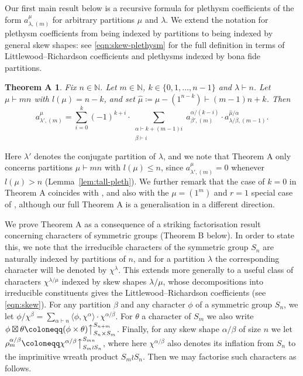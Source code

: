 \documentclass[ALCO, Unicode]{cedram}
\newcommand{\up}{\big\uparrow}
\newcommand{\N}{\mathbb{N}}
\newtheorem*{thmA}{Theorem A}
\begin{document}
Our first main result below is a recursive formula for plethysm coefficients of the form $a^\mu_{\lambda,(m)}$ for arbitrary partitions $\mu$ and $\lambda$. We extend the notation for plethysm coefficients from being indexed by partitions to being indexed by general skew shapes: see \eqref{eqn:skew-plethysm} for the full definition in terms of Littlewood--Richardson coefficients and plethysms indexed by bona fide partitions.
\begin{thmA}
	Fix $n\in\N$. Let $m\in\N$, $k\in\{0,1,\dotsc,n-1\}$ and $\lambda\vdash n$. Let $\mu\vdash mn$ with $l(\mu)=n-k$, and set $\hat{\mu}\coloneqq \mu-(1^{n-k})\vdash (m-1)n+k$. Then
	\[ a^\mu_{\lambda',(m)} = \sum_{i=0}^k (-1)^{k+i} \cdot \sum_{\substack{\alpha\vdash k+(m-1)i\\\beta\vdash i}} a^{\alpha/(k-i)}_{\beta',(m)}\cdot a^{\hat{\mu}/\alpha}_{\lambda/\beta,(m-1)}. \]
\end{thmA}
Here $\lambda'$ denotes the conjugate partition of $\lambda$, and we note that Theorem A only concerns partitions $\mu\vdash mn$ with $l(\mu)\le n$, since $a^\mu_{\lambda',(m)}=0$ whenever $l(\mu)>n$ (Lemma~\ref{lem:tall-pleth}).
We further remark that the case of $k=0$ in Theorem A coincides with \cite[Proposition 1.16]{BCV}, and also with the $\mu=(1^m)$ and $r=1$ special case of \cite[Theorem 1.1]{dBPW}, although our full Theorem A is a generalisation in a different direction.

We prove Theorem A as a consequence of a striking factorisation result concerning characters of symmetric groups (Theorem B below). 
In order to state this, we note that the irreducible characters of the symmetric group $S_n$ are naturally indexed by partitions of $n$, and for a partition $\lambda$ the corresponding character will be denoted by $\chi^\lambda$. This extends more generally to a useful class of characters $\chi^{\lambda/\mu}$ indexed by skew shapes $\lambda/\mu$, whose decompositions into irreducible constituents gives the Littlewood--Richardson coefficients (see \eqref{eqn:skew}). For any partition $\beta$ and any character $\phi$ of a symmetric group $S_n$, we let $\phi/\chi^\beta = \sum_{\alpha\vdash n} \langle \phi,\chi^\alpha\rangle \cdot \chi^{\alpha/\beta}$. For $\theta$ a character of $S_m$ we also write $\phi\boxtimes\theta\coloneqq (\phi\times\theta)\up_{S_n\times S_m}^{S_{n+m}}$. Finally, for any skew shape $\alpha/\beta$ of size $n$ we let $\rho^{\alpha/\beta}_m\coloneqq \chi^{\alpha/\beta}\up_{S_m\wr S_n}^{S_{mn}}$, where here $\chi^{\alpha/\beta}$ also denotes its inflation from $S_n$ to the imprimitive wreath product $S_m\wr S_n$. Then we may factorise such characters as follows.
\end{document}
